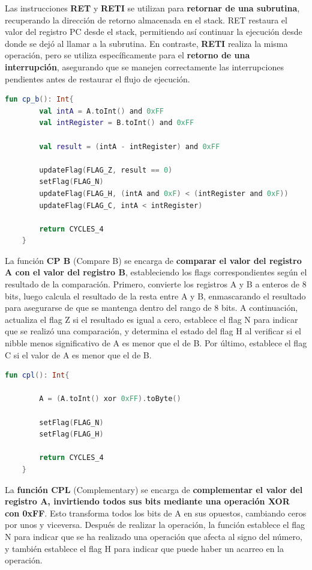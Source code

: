 Las instrucciones \textbf{RET} y \textbf{RETI} se utilizan para \textbf{retornar de una subrutina}, recuperando la dirección de retorno almacenada en el stack. RET restaura el valor del registro PC desde el stack, permitiendo así continuar la ejecución desde donde se dejó al llamar a la subrutina. En contraste, \textbf{RETI} realiza la misma operación, pero se utiliza específicamente para el \textbf{retorno de una interrupción}, asegurando que se manejen correctamente las interrupciones pendientes antes de restaurar el flujo de ejecución.

\begin{lstlisting}[language=Kotlin, caption={Operación CP}, label={code:kotlincp}]
    fun cp_b(): Int{
        val intA = A.toInt() and 0xFF
        val intRegister = B.toInt() and 0xFF

        val result = (intA - intRegister) and 0xFF

        updateFlag(FLAG_Z, result == 0)
        setFlag(FLAG_N)
        updateFlag(FLAG_H, (intA and 0xF) < (intRegister and 0xF))
        updateFlag(FLAG_C, intA < intRegister)
        
        return CYCLES_4
    }
\end{lstlisting}

La función \textbf{CP B} (Compare B) se encarga de \textbf{comparar el valor del registro A con el valor del registro B}, estableciendo los flags correspondientes según el resultado de la comparación. Primero, convierte los registros A y B a enteros de 8 bits, luego calcula el resultado de la resta entre A y B, enmascarando el resultado para asegurarse de que se mantenga dentro del rango de 8 bits. A continuación, actualiza el flag Z si el resultado es igual a cero, establece el flag N para indicar que se realizó una comparación, y determina el estado del flag H al verificar si el nibble menos significativo de A es menor que el de B. Por último, establece el flag C si el valor de A es menor que el de B.

\begin{lstlisting}[language=Kotlin, caption={Operación CPL}, label={code:kotlincpl}]
    fun cpl(): Int{

        A = (A.toInt() xor 0xFF).toByte()

        setFlag(FLAG_N)
        setFlag(FLAG_H)

        return CYCLES_4
    }
\end{lstlisting}

La \textbf{función CPL} (Complementary) se encarga de \textbf{complementar el valor del registro A, invirtiendo todos sus bits mediante una operación XOR con 0xFF}. Esto transforma todos los bits de A en sus opuestos, cambiando ceros por unos y viceversa. Después de realizar la operación, la función establece el flag N para indicar que se ha realizado una operación que afecta al signo del número, y también establece el flag H para indicar que puede haber un acarreo en la operación.


